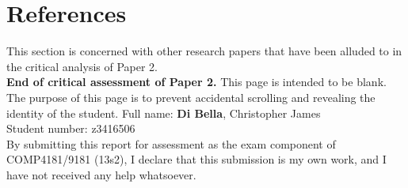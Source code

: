 \documentclass[9pt,twocolumn]{article}
\begin{document}
\section*{References}
This section is concerned with other research papers that have been alluded to in the critical analysis of Paper 2.\\

\noindent
{\bf End of critical assessment of Paper 2.}
\clearpage
\noindent
This page is intended to be blank.\\

\noindent
The purpose of this page is to prevent accidental scrolling and revealing the identity of the student.
\clearpage
\noindent
Full name: \hspace{8mm} {\bf Di Bella}, Christopher James\\
Student number: z3416506\\

\noindent
By submitting this report for assessment as the exam component of COMP4181/9181 (13s2), I declare that this submission is my own work, and I have not received any help whatsoever.
\end{document}
